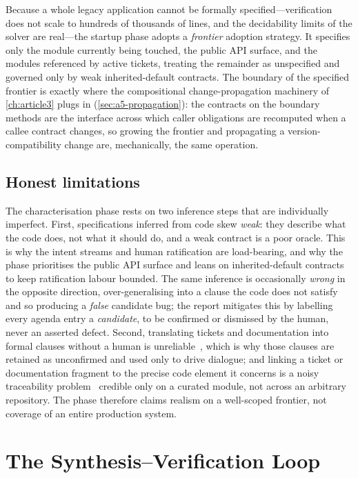 Because a whole legacy application cannot be formally specified---verification does not scale to hundreds of thousands of lines, and the decidability limits of the solver are real---the startup phase adopts a \emph{frontier} adoption strategy. It specifies only the module currently being touched, the public API surface, and the modules referenced by active tickets, treating the remainder as unspecified and governed only by weak inherited-default contracts. The boundary of the specified frontier is exactly where the compositional change-propagation machinery of \cref{ch:article3} plugs in (\cref{sec:a5-propagation}): the contracts on the boundary methods are the interface across which caller obligations are recomputed when a callee contract changes, so growing the frontier and propagating a version-compatibility change are, mechanically, the same operation.

\subsection{Honest limitations}\label{subsec:a5-bflimits}

The characterisation phase rests on two inference steps that are individually imperfect. First, specifications inferred from code skew \emph{weak}: they describe what the code does, not what it should do, and a weak contract is a poor oracle. This is why the intent streams and human ratification are load-bearing, and why the phase prioritises the public API surface and leans on inherited-default contracts to keep ratification labour bounded. The same inference is occasionally \emph{wrong} in the opposite direction, over-generalising into a clause the code does not satisfy and so producing a \emph{false} candidate bug; the report mitigates this by labelling every agenda entry a \emph{candidate}, to be confirmed or dismissed by the human, never an asserted defect. Second, translating tickets and documentation into formal clauses without a human is unreliable~\cite{cosler2023nl2spec,lahiri2025nl2contract}, which is why those clauses are retained as unconfirmed and used only to drive dialogue; and linking a ticket or documentation fragment to the precise code element it concerns is a noisy traceability problem~\cite{antoniol2002recovering,borg2014recovering,lin2021tbert} credible only on a curated module, not across an arbitrary repository. The phase therefore claims realism on a well-scoped frontier, not coverage of an entire production system.

\section{The Synthesis--Verification Loop}\label{sec:a5-loop}

